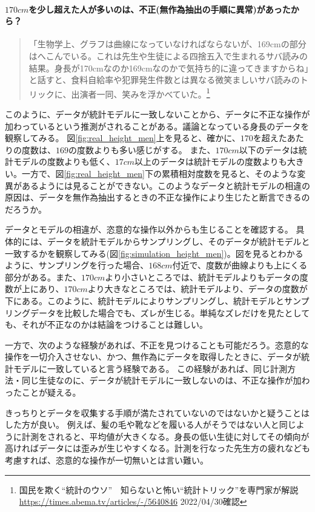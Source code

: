 \documentclass[a4paper,11pt,dvipdfmx]{jsarticle}
\begin{document}
\paragraph{$170cm$を少し超えた人が多いのは、不正(無作為抽出の手順に異常)があったから？}
\begin{quotation}
    「生物学上、グラフは曲線になっていなければならないが、169cmの部分はへこんでいる。これは先生や生徒による四捨五入で生まれるサバ読みの結果。身長が170cmなのか169cmなのかで気持ち的に違ってきますからね」と話すと、食料自給率や犯罪発生件数とは異なる微笑ましいサバ読みのトリックに、出演者一同、笑みを浮かべていた。\footnote{国民を欺く“統計のウソ”　知らないと怖い“統計トリック”を専門家が解説
    \url{https://times.abema.tv/articles/-/5640846} 2022/04/30確認}
\end{quotation}

このように、データが統計モデルに一致しないことから、データに不正な操作が加わっているという推測がされることがある。議論となっている身長のデータを観察してみる。
図\ref{fig:real_height_men}上を見ると、確かに、$170$を超えたあたりの度数は、$169$の度数よりも多い感じがする。
また、$170cm$以下のデータは統計モデルの度数よりも低く、$17cm$以上のデータは統計モデルの度数よりも大きい。一方で、図\ref{fig:real_height_men}下の累積相対度数を見ると、そのような変異があるようには見ることができない。このようなデータと統計モデルの相違の原因は、データを無作為抽出するときの不正な操作により生じたと断言できるのだろうか。

データとモデルの相違が、恣意的な操作以外からも生じることを確認する。
具体的には、データを統計モデルからサンプリングし、そのデータが統計モデルと一致するかを観察してみる(図\ref{fig:simulation_height_men})。図を見るとわかるように、サンプリングを行った場合、$168cm$付近で、度数が曲線よりも上にくる部分がある。また、$170cm$より小さいところでは、統計モデルよりもデータの度数が上にあり、$170cm$より大きなところでは、統計モデルより、データの度数が下にある。このように、統計モデルによりサンプリングし、統計モデルとサンプリングデータを比較した場合でも、ズレが生じる。単純なズレだけを見たとしても、それが不正なのかは結論をつけることは難しい。

一方で、次のような経験があれば、不正を見つけることも可能だろう。恣意的な操作を一切介入させない、かつ、無作為にデータを取得したときに、データが統計モデルに一致していると言う経験である。
この経験があれば、同じ計測方法・同じ生徒なのに、データが統計モデルに一致しないのは、不正な操作が加わったことが疑える。

きっちりとデータを収集する手順が満たされていないのではないかと疑うことはした方が良い。
例えば、髪の毛や靴などを履いる人がそうではない人と同じように計測をされると、平均値が大きくなる。身長の低い生徒に対してその傾向が高ければデータには歪みが生じやすくなる。計測を行なった先生方の疲れなども考慮すれば、恣意的な操作が一切無いとは言い難い。
\end{document}
